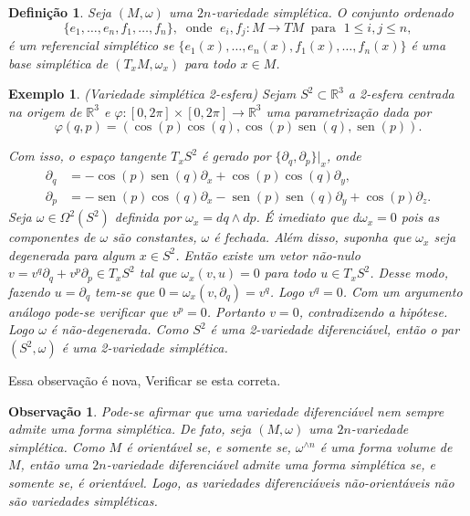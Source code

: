 \documentclass[12pt]{book}
\newtheorem{definicao}[teorema]{Definição}
\newtheorem{exemplo}[teorema]{Exemplo}
\newtheorem{observacao}[teorema]{Observação}
\DeclareMathOperator{\sen}{sen}
\newcommand{\derivadaparcialabrev}[1]{\partial_{#1}}
\newcommand{\espacotangenteponto}[2]{T_{#1}#2}
\newcommand{\real}[1]{\mathbb{R}^{#1}}
\newcommand{\alerta}[1]{{\color{red}#1}}
\begin{document}
	\begin{definicao}Seja $(M, \omega)$ uma $2n$-variedade simplética.
		O conjunto ordenado 
		$$
		\{e_{1}, \dots, e_{n}, f_{1},\dots , f_{n}\}, \;\;\text{onde }\; e_{i}, f_{j}:M\to TM
		\;\; \text{para }\;1\leq i,j\leq n,
		$$
		é um referencial simplético se $\{e_{1}(x), \dots, e_{n}(x), f_{1}(x),\dots , f_{n}(x)\}$ é uma base simplética de $(\espacotangenteponto{x}{M},\omega_{x})$ para todo $x\in M$.
	\end{definicao}
	
	\begin{exemplo}\label{exemplo_variedade_simpletica_esfera}
		(Variedade simplética 2-esfera) Sejam $S^{2} \subset \real{3}$ a 2-esfera centrada na origem de $\real{3}$ e $\varphi:[0,2\pi]\times [0,2\pi] \to \real{3}$ uma parametrização dada por 
		$$
		\varphi(q, p) = (\cos (p) \cos (q), \cos (p) \sen (q), \sen (p)).
		$$
		
		Com isso, o espaço tangente $T_{x}S^{2} $ é gerado por $ \{\derivadaparcialabrev{ q}, \derivadaparcialabrev{ p} \}|_{x}$, onde
		$$
		\begin{aligned}
		\derivadaparcialabrev{ q} &= -\cos (p)\sen (q) \derivadaparcialabrev{x}+ \cos (p)\cos (q) \derivadaparcialabrev{y},
		\\
		\derivadaparcialabrev{ p} &=  - \sen (p) \cos (q) 	\derivadaparcialabrev{x} - \sen (p) \sen (q) 	\derivadaparcialabrev{y} +\cos (p)				\derivadaparcialabrev{z}.
		\end{aligned} 
		$$
		Seja $\omega\in \Omega^{2}(S^{2})$ definida por $\omega_{x} = dq \wedge dp$. É imediato que $d\omega_{x} = 0$ pois as componentes de $\omega$ são constantes, $\omega$ é fechada. Além disso, suponha que $\omega_{x}$ seja degenerada para algum $x \in S^{2}$. Então existe um vetor não-nulo $v = v^{q}\partial_{q}+v^{p}\partial_{p} \in T_{x}S^{2}$ tal que $\omega_{x}(v, u)=0$ para todo $u\in T_{x}S^{2}$. Desse modo, fazendo $u = \partial_{q}$ tem-se que $0=\omega_{x}(v, \partial_{q}) = v^{q}$. Logo $v^{q}=0$. Com um argumento análogo pode-se verificar que $v^{p}=0$. Portanto $v=0$, contradizendo a hipótese. Logo $\omega$ é não-degenerada. Como $S^{2}$ é uma 2-variedade diferenciável, então o par $(S^{2}, \omega)$ é uma 2-variedade simplética.
	\end{exemplo}
	
	\alerta{Essa observação é nova, Verificar se esta correta.}
	\begin{observacao}
		Pode-se afirmar que uma variedade diferenciável nem sempre admite uma forma simplética. De fato, seja $(M,\omega)$ uma $2n$-variedade simplética. Como $M$ é orientável se, e somente se, $\omega^{\wedge n}$ é uma forma volume de $M$, então uma $2n$-variedade diferenciável admite uma forma simplética se, e somente se, é orientável. Logo, as variedades diferenciáveis não-orientáveis não são variedades simpléticas.
	\end{observacao}
	
\end{document}
